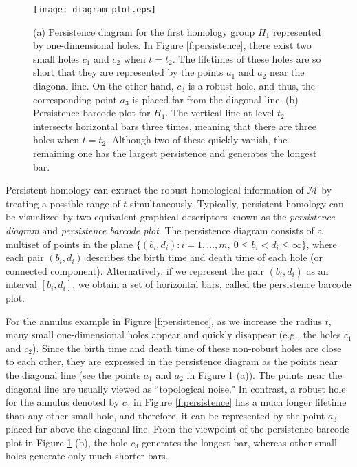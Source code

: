 \documentclass[11pt]{amsart}
\numberwithin{equation}{section}
\theoremstyle{plain}
\theoremstyle{definition}
\begin{document}
\begin{figure}[!t]
\begin{center}
\texttt{[image: diagram-plot.eps]}
\caption{{\footnotesize (a) Persistence diagram for the first homology group $H_1$ represented by one-dimensional holes. In Figure \ref{f:persistence}, there exist two small holes $c_1$ and $c_2$ when $t=t_2$. The lifetimes of these holes are so short that they are represented by the points $a_1$ and $a_2$ near the diagonal line. On the other hand, $c_3$ is a robust hole, and thus, the corresponding point $a_3$ is placed far from the diagonal line. (b) Persistence barcode plot for $H_1$. The vertical line at level $t_2$ intersects horizontal bars three times, meaning that there are three holes when $t=t_2$. Although two of these quickly vanish, the remaining one has the largest persistence and generates the longest bar. }}
\label{f:diagram-plot}
\end{center}
\end{figure}

 Persistent homology can extract the robust homological information of $\mathcal M$ by treating a possible range of $t$ simultaneously. Typically, persistent homology can be visualized by two equivalent graphical descriptors known as the \textit{persistence diagram} and \textit{persistence barcode plot}. The persistence diagram consists of a multiset of points in the plane $\bigl\{ (b_i, d_i): i=1,\dots, m,\ 0 \leq b_i < d_i \leq \infty \bigr\}$, where each pair $(b_i, d_i)$ describes the birth time and death time of each hole (or connected component). Alternatively, if we represent the pair $(b_i, d_i)$ as an interval $[b_i, d_i]$, we obtain a set of horizontal bars, called the persistence barcode plot.

For the annulus example in Figure \ref{f:persistence}, as we increase the radius $t$, many small one-dimensional holes appear and quickly disappear (e.g., the holes $c_1$ and $c_2$). Since the birth time and death time of these non-robust holes are close to each other, they are expressed in the persistence diagram as the points near the diagonal line (see the points $a_1$ and $a_2$ in Figure \ref{f:diagram-plot} (a)). The points near the diagonal line are usually viewed as ``topological noise." In contrast, a robust hole for the annulus denoted by $c_3$ in Figure \ref{f:persistence} has a much longer lifetime than any other small hole, and therefore, it can be represented by the point $a_3$ placed far above the diagonal line. From the viewpoint of the persistence barcode plot in Figure \ref{f:diagram-plot} (b), the hole $c_3$ generates the longest bar, whereas other small holes generate only much shorter bars.
\end{document}
